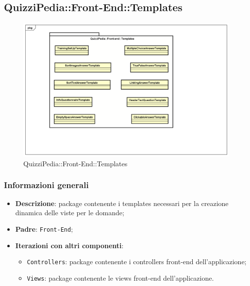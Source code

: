 \newpage

\subsection{QuizziPedia::Front-End::Templates}

	\label{QuizziPedia::Front-End::Templates}

	\begin{figure}[ht]
		\centering
		\includegraphics[scale=0.5,keepaspectratio]{UML/Package/QuizziPedia_Front-End_Templates.png}
		\caption{QuizziPedia::Front-End::Templates}
	\end{figure} \FloatBarrier
	
	\subsubsection{Informazioni generali}
		\begin{itemize}
			\item \textbf{Descrizione}: package contenente i templates necessari per la creazione dinamica delle viste per le domande;
			\item \textbf{Padre}: \texttt{Front-End};
			\item \textbf{Iterazioni con altri componenti}: 
				\begin{itemize}
					\item \texttt{Controllers}: package contenente i controllers front-end dell'applicazione;
					\item \texttt{Views}: package contenente le views front-end dell'applicazione.
				\end{itemize}
		\end{itemize}

